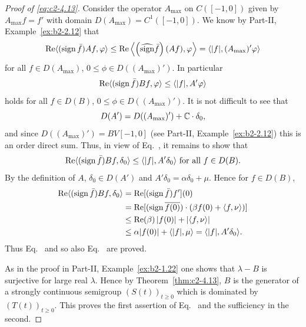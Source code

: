 \begin{example}
\begin{proof}[Proof of \eqref{eq:c2-4.13}]
Consider the operator $A_{\max}$ on $C([-1,0])$ given by $A_{\max}f = f'$ with domain $D(A_{\max}) = C^{1}([-1,0])$.
We know by Part-II, Example~\ref{ex:b2-2.12} 
that 
\[
\Re\langle(\sign  \bar{f})Af,\phi\rangle \leq \Re\left\langle\left(\widehat{\sign}  \bar{f}\right)(Af),\phi\right\rangle = \langle|f|, (A_{\max})'\phi\rangle
\]
for all $f \in D(A_{\max})$, $0 \leq \phi \in D((A_{\max})')$.
In particular
\begin{equation}\label{eq:c2-4.14}
\Re\langle(\sign  \bar{f})Bf,\phi\rangle \leq \langle|f|,A'\phi\rangle
\end{equation}
holds for all $f \in D(B)$, $0 \leq \phi \in D((A_{\max})')$.
It is not difficult to see that 
\[
D(A') = D((A_{\max})') + \mathbb{C}\cdot\delta_{0} ,
\]
and since $D((A_{\max})') = BV[-1,0]$
(see Part-II, Example~\ref{ex:b2-2.12})
this is an order direct sum.
Thus, in view of Eq.~, it remains to show that
\begin{equation}\label{eq:c2-4.15}
\Re\langle(\sign  \bar{f})Bf,\delta_{0}\rangle \leq \langle|f|,A'\delta_{0}\rangle \text{ for all } f \in D(B) .
\end{equation}
By the definition of\/ $A$, $\delta_{0} \in D(A')$ and $A'\delta_{0} =  \alpha\delta_{0} + \mu$.
Hence for $f \in D(B)$,
\begin{align*}
\Re\langle(\sign \bar{f})Bf,\delta_{0}\rangle &= \Re[(\sign \bar{f})f'](0) \\
&= \Re[(\sign  \overline{f(0)})\cdot(\beta f(0) +  \langle f,\nu\rangle)] \\
&\leq \Re(\beta) \, |f(0)| + |\langle f,\nu\rangle| \\
&\leq \alpha|f(0)| + \langle|f|,\mu\rangle = \langle|f|,A'\delta_{0}\rangle.
\end{align*}
Thus Eq.~ and so also Eq.~ are proved.

As in the proof in  Part-II, Example~\ref{ex:b2-1.22} one shows that $\lambda - B$ is surjective for large real $\lambda$.
Hence by Theorem~\ref{thm:c2-4.13}, $B$ is the generator of a
strongly continuous semigroup $(S(t))_{t \geq 0}$ which is dominated by
$(T(t))_{t \geq 0}$.
This proves the first assertion of Eq.~ and the sufficiency in the second.


\end{proof}
\end{example}
